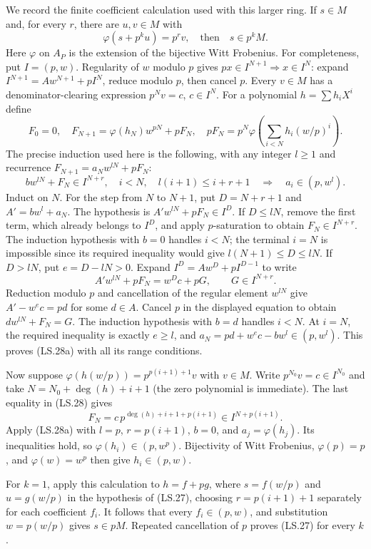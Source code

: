 We record the finite coefficient calculation used with this larger
ring. If $s\in M$ and, for every $r$, there are $u,v\in M$ with
\[
              \varphi(s+p^k u)=p^r v,
 \quad\text{then}\quad s\in p^kM.                 \tag{LS.27}
\]
Here $\varphi$ on $A_P$ is the extension of the bijective Witt
Frobenius. For completeness, put $I=(p,w)$. Regularity of $w$
modulo $p$ gives
$px\in I^{N+1}\Rightarrow x\in I^N$: expand
$I^{N+1}=Aw^{N+1}+pI^N$, reduce modulo $p$, then cancel $p$.
Every $v\in M$ has a denominator-clearing expression
$p^Nv=c$, $c\in I^N$.
For a polynomial $h=\sum h_iX^i$ define
\[
 F_0=0,\quad F_{N+1}=\varphi(h_N)w^{pN}+pF_N,
 \quad
 pF_N=p^N\varphi\!\left(\sum_{i<N}h_i(w/p)^i\right).
 \tag{LS.28}
\]
The precise induction used here is the following, with any integer
$l\ge1$ and recurrence $F_{N+1}=a_Nw^{lN}+pF_N$:
\[
 b w^{lN}+F_N\in I^{N+r},\quad i<N,\quad
 l(i+1)\le i+r+1
 \quad\Longrightarrow\quad a_i\in(p,w^l).             \tag{LS.28a}
\]
Induct on $N$. For the step from $N$ to $N+1$, put
$D=N+r+1$ and $A'=bw^l+a_N$. The hypothesis is
$A'w^{lN}+pF_N\in I^D$. If $D\le lN$, remove the first
term, which already belongs to $I^D$, and apply $p$-saturation
to obtain $F_N\in I^{N+r}$. The induction hypothesis with
$b=0$ handles $i<N$; the terminal $i=N$ is impossible since
its required inequality would give $l(N+1)\le D\le lN$.
If $D>lN$, put $e=D-lN>0$. Expand
$I^D=Aw^D+pI^{D-1}$ to write
\[
 A'w^{lN}+pF_N=w^Dc+pG,\qquad G\in I^{N+r}.
\]
Reduction modulo $p$ and cancellation of the regular element
$w^{lN}$ give $A'-w^ec=pd$ for some $d\in A$.
Cancel $p$ in the displayed equation to obtain
$d w^{lN}+F_N=G$. The induction hypothesis with $b=d$
handles $i<N$. At $i=N$, the required inequality is exactly
$e\ge l$, and
$a_N=pd+w^ec-bw^l\in(p,w^l)$. This proves (LS.28a)
with all its range conditions.

Now suppose $\varphi(h(w/p))=p^{p(i+1)+1}v$ with $v\in M$.
Write $p^{N_0}v=c\in I^{N_0}$ and take
$N=N_0+\deg(h)+i+1$ (the zero polynomial is immediate).
The last equality in (LS.28) gives
\[
 F_N=c\,p^{\deg(h)+i+1+p(i+1)}\in I^{N+p(i+1)}.
\]
Apply (LS.28a) with $l=p$, $r=p(i+1)$, $b=0$, and
$a_j=\varphi(h_j)$. Its inequalities hold, so
$\varphi(h_i)\in(p,w^p)$. Bijectivity of Witt Frobenius,
$\varphi(p)=p$, and $\varphi(w)=w^p$ then give
$h_i\in(p,w)$.

For $k=1$, apply this calculation to $h=f+p g$, where
$s=f(w/p)$ and $u=g(w/p)$ in the hypothesis of (LS.27), choosing
$r=p(i+1)+1$ separately for each coefficient $f_i$.
It follows that every $f_i\in(p,w)$, and substitution
$w=p(w/p)$ gives $s\in pM$. Repeated cancellation of $p$
proves (LS.27) for every $k$.

